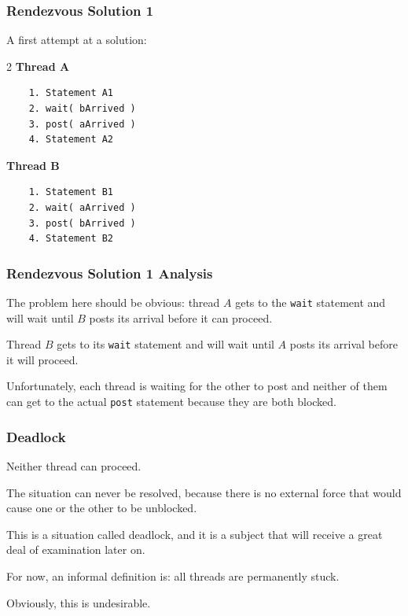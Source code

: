 \begin{frame}[fragile]
	\frametitle{Rendezvous Solution 1}

	A first attempt at a solution:

	\begin{multicols}{2}
		\textbf{Thread A}
		\begin{verbatim}
	1. Statement A1
	2. wait( bArrived )
	3. post( aArrived )
	4. Statement A2
  		\end{verbatim}
		\columnbreak
		\textbf{Thread B}\vspace{-2em}
		\begin{verbatim}
	1. Statement B1
	2. wait( aArrived )
	3. post( bArrived )
	4. Statement B2
  		\end{verbatim}
	\end{multicols}
	\vspace{-2em}


\end{frame}

\begin{frame}
	\frametitle{Rendezvous Solution 1 Analysis}

	The problem here should be obvious: thread $A$ gets to the \texttt{wait} statement and will wait until $B$ posts its arrival before it can proceed.

	Thread $B$ gets to its \texttt{wait} statement and will wait until $A$ posts its arrival before it will proceed.

	Unfortunately, each thread is waiting for the other to post and neither of them can get to the actual \texttt{post} statement because they are both blocked.


\end{frame}

\begin{frame}
	\frametitle{Deadlock}

	Neither thread can proceed.

	The situation can never be resolved, because there is no external force that would cause one or the other to be unblocked.

	This is a situation called \alert{deadlock}, and it is a subject that will receive a great deal of examination later on.

	For now, an informal definition is: all threads are permanently stuck.

	Obviously, this is undesirable.

\end{frame}

